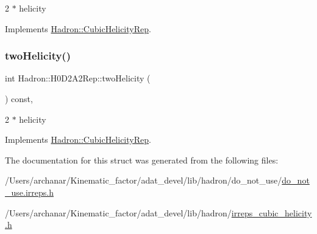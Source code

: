 2 $\ast$ helicity 

Implements \mbox{\hyperlink{structHadron_1_1CubicHelicityRep_af507aa56fc2747eacc8cb6c96db31ecc}{Hadron\+::\+Cubic\+Helicity\+Rep}}.

\mbox{\label{structHadron_1_1H0D2A2Rep_ac561e7d1621438c3f64d1d13a2f62098}} 
\subsubsection{\texorpdfstring{twoHelicity()}{twoHelicity()}\hspace{0.1cm}{\footnotesize\ttfamily [2/2]}}
{\footnotesize\ttfamily int Hadron\+::\+H0\+D2\+A2\+Rep\+::two\+Helicity (\begin{DoxyParamCaption}{ }\end{DoxyParamCaption}) const\hspace{0.3cm}{\ttfamily [inline]}, {\ttfamily [virtual]}}

2 $\ast$ helicity 

Implements \mbox{\hyperlink{structHadron_1_1CubicHelicityRep_af507aa56fc2747eacc8cb6c96db31ecc}{Hadron\+::\+Cubic\+Helicity\+Rep}}.



The documentation for this struct was generated from the following files\+:\begin{DoxyCompactItemize}
\item 
/\+Users/archanar/\+Kinematic\+\_\+factor/adat\+\_\+devel/lib/hadron/do\+\_\+not\+\_\+use/\mbox{\hyperlink{do__not__use_8irreps_8h}{do\+\_\+not\+\_\+use.\+irreps.\+h}}\item 
/\+Users/archanar/\+Kinematic\+\_\+factor/adat\+\_\+devel/lib/hadron/\mbox{\hyperlink{lib_2hadron_2irreps__cubic__helicity_8h}{irreps\+\_\+cubic\+\_\+helicity.\+h}}\end{DoxyCompactItemize}
